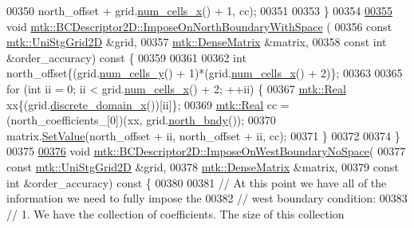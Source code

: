 \begin{DoxyCode}
00350                   north\_offset + grid.\hyperlink{classmtk_1_1UniStgGrid2D_a2d182866a398aba8e4829590e85bf939}{num\_cells\_x}() + 1, cc);
00351 
00353 \}
00354 
\hypertarget{mtk__bc__descriptor__2d_8cc_source_l00355}{}\hyperlink{classmtk_1_1BCDescriptor2D_a6b9b6f2bec06bce5a9070236ca10ec3a}{00355} \textcolor{keywordtype}{void} \hyperlink{classmtk_1_1BCDescriptor2D_a6b9b6f2bec06bce5a9070236ca10ec3a}{mtk::BCDescriptor2D::ImposeOnNorthBoundaryWithSpace}
      (
00356     \textcolor{keyword}{const} \hyperlink{classmtk_1_1UniStgGrid2D}{mtk::UniStgGrid2D} &grid,
00357     \hyperlink{classmtk_1_1DenseMatrix}{mtk::DenseMatrix} &matrix,
00358     \textcolor{keyword}{const} \textcolor{keywordtype}{int} &order\_accuracy)\textcolor{keyword}{ const }\{
00359 
00361 
00362   \textcolor{keywordtype}{int} north\_offset\{(grid.\hyperlink{classmtk_1_1UniStgGrid2D_aed05a801cc9a76dba0ff203cea58a61a}{num\_cells\_y}() + 1)*(grid.\hyperlink{classmtk_1_1UniStgGrid2D_a2d182866a398aba8e4829590e85bf939}{num\_cells\_x}() + 2)\};
00363 
00365   \textcolor{keywordflow}{for} (\textcolor{keywordtype}{int} ii = 0; ii < grid.\hyperlink{classmtk_1_1UniStgGrid2D_a2d182866a398aba8e4829590e85bf939}{num\_cells\_x}() + 2; ++ii) \{
00367     \hyperlink{group__c01-roots_gac080bbbf5cbb5502c9f00405f894857d}{mtk::Real} xx\{(grid.\hyperlink{classmtk_1_1UniStgGrid2D_ab2f70cf5cd0a2d5486992d9f2f8baa4a}{discrete\_domain\_x}())[ii]\};
00369     \hyperlink{group__c01-roots_gac080bbbf5cbb5502c9f00405f894857d}{mtk::Real} cc = (north\_coefficients\_[0])(xx, grid.\hyperlink{classmtk_1_1UniStgGrid2D_afe1ead253cdeb5503e0489eba8fd84e2}{north\_bndy}());
00370     matrix.\hyperlink{classmtk_1_1DenseMatrix_a784ce5784109ac86bfb9d8562b334b13}{SetValue}(north\_offset + ii, north\_offset + ii, cc);
00371   \}
00372 
00374 \}
00375 
\hypertarget{mtk__bc__descriptor__2d_8cc_source_l00376}{}\hyperlink{classmtk_1_1BCDescriptor2D_a0b153abdcb78c54197858148c9632517}{00376} \textcolor{keywordtype}{void} \hyperlink{classmtk_1_1BCDescriptor2D_a0b153abdcb78c54197858148c9632517}{mtk::BCDescriptor2D::ImposeOnWestBoundaryNoSpace}(
00377     \textcolor{keyword}{const} \hyperlink{classmtk_1_1UniStgGrid2D}{mtk::UniStgGrid2D} &grid,
00378     \hyperlink{classmtk_1_1DenseMatrix}{mtk::DenseMatrix} &matrix,
00379     \textcolor{keyword}{const} \textcolor{keywordtype}{int} &order\_accuracy)\textcolor{keyword}{ const }\{
00380 
00381   \textcolor{comment}{// At this point we have all of the information we need to fully impose the}
00382   \textcolor{comment}{// west boundary condition:}
00383   \textcolor{comment}{// 1. We have the collection of coefficients. The size of this collection}

\end{DoxyCode}
